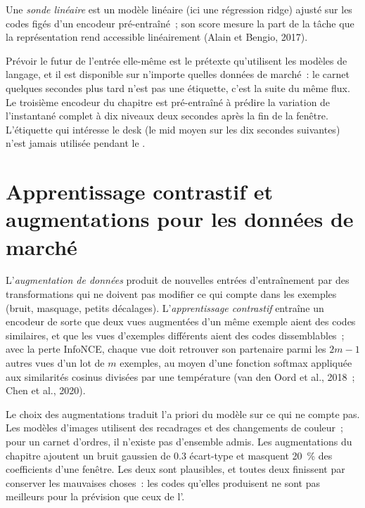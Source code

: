 \begin{definition}\label{def:ml:representation-learning:probe}
Une \emph{sonde linéaire} est un modèle linéaire (ici une régression ridge) ajusté sur les codes figés
d'un encodeur pré-entraîné~; son score mesure la part de la tâche que la représentation rend accessible linéairement (Alain et
Bengio, 2017).
\end{definition}

Prévoir le futur de l'entrée elle-même est le prétexte qu'utilisent les modèles de langage, et il est disponible sur n'importe quelles données de marché~:
le carnet quelques secondes plus tard n'est pas une étiquette, c'est la suite du même flux. Le troisième encodeur du chapitre est
pré-entraîné à prédire la variation de l'instantané complet à dix niveaux deux secondes après la fin de la fenêtre. L'étiquette
qui intéresse le desk (le mid moyen sur les dix secondes suivantes) n'est jamais utilisée pendant le .

\section{Apprentissage contrastif et augmentations pour les données de marché}

\begin{definition}\label{def:ml:representation-learning:contrastive}
L'\emph{augmentation de données} produit de nouvelles entrées d'entraînement par des transformations qui ne doivent pas modifier
ce qui compte dans les exemples (bruit, masquage, petits décalages). L'\emph{apprentissage contrastif} entraîne un encodeur de sorte que
deux vues augmentées d'un même exemple aient des codes similaires, et que les vues d'exemples différents aient des codes dissemblables~; avec la perte InfoNCE,
chaque vue doit retrouver son partenaire parmi les $2m - 1$ autres vues d'un lot de $m$ exemples, au moyen d'une fonction softmax appliquée aux similarités cosinus divisées par une température
(van den Oord et al., 2018~; Chen et al., 2020).
\end{definition}

Le choix des augmentations traduit l'a priori du modèle sur ce qui ne compte pas. Les modèles d'images utilisent des recadrages et des changements de couleur~;
pour un carnet d'ordres, il n'existe pas d'ensemble admis. Les augmentations du chapitre ajoutent un bruit gaussien de 0.3 écart-type et
masquent 20~\% des coefficients d'une fenêtre. Les deux sont plausibles, et toutes deux finissent par conserver les mauvaises choses~: les codes
qu'elles produisent ne sont pas meilleurs pour la prévision que ceux de l'.

